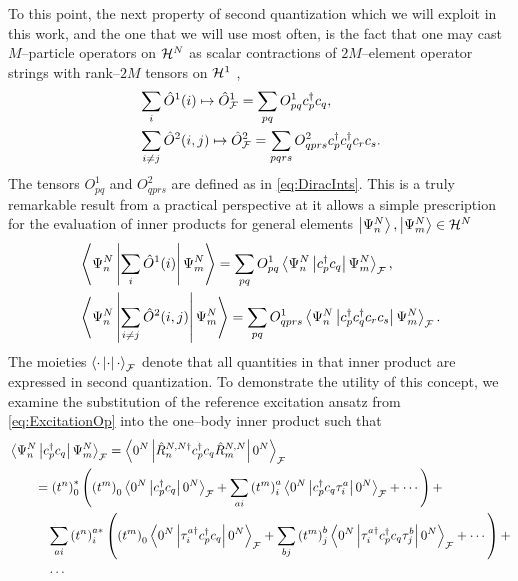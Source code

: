 To this point, the next property of second quantization which we will exploit in this work,
and the one that we will use most often, is the fact that one may
cast $M$--particle operators on $\mathcal{H}^N$ as scalar contractions of $2M$--element operator 
strings with rank--$2M$ tensors on $\mathcal{H}^1$ \cite{Walecka12_book,Schuck04_book,Ostlund12_book},
\begin{subequations}
\label{eq:SeQuantOp}
\begin{align}
  &\sum_i \hat{O}^1(i) \mapsto \hat{O}_{\mathcal{F}}^1 = \sum_{pq}   O^1_{pq} c^\dagger_p c_q,\\
  &\sum_{i\neq j}\hat{O}^2(i,j) \mapsto \hat{O}_{\mathcal{F}}^2 = \sum_{pqrs} O^2_{qprs} c^\dagger _p c^\dagger _q c_r c_s.
\end{align}
\end{subequations}
The tensors $O^1_{pq}$ and $O^2_{qprs}$ are defined as in \cref{eq:DiracInts}. This is a truly remarkable
result from a practical perspective at it allows a simple prescription  for the evaluation of 
inner products for general elements $\left\vert \Psi_n^N \right\rangle, \left\vert \Psi_m^N \right\rangle \in \mathcal{H}^N$
\begin{subequations}
\label{eq:SeQuantInner}
\begin{align}
&\left\langle \Psi_n^N \left\vert \sum_i \hat{O}^1(i) \right\vert \Psi_m^N \right\rangle = \sum_{pq} O^1_{pq} \left\langle \Psi_n^N \left\vert c_p^\dagger c_q \right\vert \Psi_m^N \right\rangle_{\mathcal{F}}, \\
&\left\langle \Psi_n^N \left\vert \sum_{i\neq j} \hat{O}^2(i,j) \right\vert \Psi_m^N \right\rangle = \sum_{pq} O^1_{qprs} \left\langle \Psi_n^N \left\vert c_p^\dagger c_q^\dagger c_r c_s \right\vert \Psi_m^N \right\rangle_{\mathcal{F}}.
\end{align}
\end{subequations}
The moieties $\left\langle \cdot \left\vert \cdot \right\vert \cdot \right\rangle_{\mathcal{F}}$ denote that all quantities in that inner product are expressed in second quantization.
To demonstrate the utility of this concept, we examine the substitution of the reference excitation ansatz from \cref{eq:ExcitationOp}
into the one--body inner product such that
\begin{align}
\label{eq:SeQuantInnerExp}
&\left\langle \Psi_n^N \left\vert c_p^\dagger c_q \right\vert \Psi_m^N \right\rangle_{\mathcal{F}} = \left\langle 0^N \left\vert \hat{R}^{N,N\dagger}_n c_p^\dagger c_q \hat{R}^{N,N}_m \right\vert 0^N \right\rangle_{\mathcal{F}} \nonumber \\
&\qquad= \left( t^n \right)^*_0 \left(
     \left( t^m \right)_0 \left\langle 0^N \left\vert c_p^\dagger c_q \right\vert 0^N \right\rangle_{\mathcal{F}} +
     \sum_{ai} \left( t^m \right)^{a}_i \left\langle 0^N \left\vert c_p^\dagger c_q \tau^{a}_i \right\vert 0^N \right\rangle_{\mathcal{F}} + \cdots
   \right) + \nonumber \\
&\qquad \quad \sum_{ai}\left( t^n \right)^{a*}_i \left(
         \left( t^m \right)_0 \left\langle 0^N \left\vert \tau_i^{a\dagger} c_p^\dagger c_q \right\vert 0^N \right\rangle_{\mathcal{F}} +
         \sum_{bj} \left( t^m \right)^{b}_j \left\langle 0^N \left\vert \tau_i^{a\dagger} c_p^\dagger c_q \tau^{b}_j \right\vert 0^N \right\rangle_{\mathcal{F}} + \cdots
       \right) + \nonumber\\
&\qquad \quad \cdots
\end{align}
